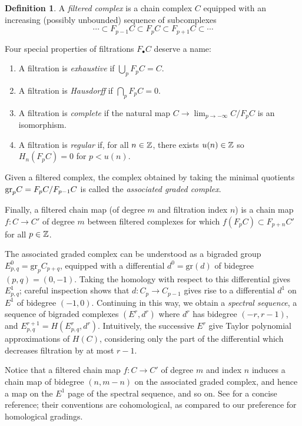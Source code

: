 \documentclass{memo-l}
\theoremstyle{definition}
\newtheorem{definition}[theorem]{Definition}
\theoremstyle{remark}
\numberwithin{section}{chapter}
\numberwithin{equation}{chapter}
\begin{document}
\begin{definition}\label{filtrations}
A \emph{filtered complex} is a chain complex $C$ equipped with an increasing (possibly unbounded) sequence of subcomplexes $$\cdots \subset F_{p-1} C \subset F_p C \subset F_{p+1} C \subset \cdots$$ 

Four special properties of filtrations $F_\bullet C$ deserve a name: \begin{enumerate}
\item A filtration is \emph{exhaustive} if $\bigcup_p F_p C = C$. 
\item A filtration is \emph{Hausdorff} if $\bigcap_p F_p C = 0$.
\item A filtration is \emph{complete} if the natural map $C \to \lim_{p \to -\infty} C/F_p C$ is an isomorphism.
\item A filtration is \emph{regular} if, for all $n \in \Bbb Z$, there exists $u(n) \in \Bbb Z$ so $H_n(F_p C) = 0$ for $p < u(n)$. 
\end{enumerate}

Given a filtered complex, the complex obtained by taking the minimal quotients $\textup{gr}_p C = F_p C/F_{p-1} C$ is called the \emph{associated graded complex}.

Finally, a \textup{filtered chain map} (of degree $m$ and filtration index $n$) is a chain map $f: C \to C'$ of degree $m$ between filtered complexes for which $f(F_p C) \subset F_{p+n} C'$ for all $p \in \Bbb Z$. 
\end{definition}

The associated graded complex can be understood as a bigraded group $E^0_{p,q} = \text{gr}_p C_{p+q}$, equipped with a differential $d^0 = \text{gr}(d)$ of bidegree $(p,q) = (0, -1)$. Taking the homology with respect to this differential gives $E^1_{p,q}$; careful inspection shows that $d: C_p \to C_{p-1}$ gives rise to a differential $d^1$ on $E^1$ of bidegree $(-1, 0)$. Continuing in this way, we obtain a \emph{spectral sequence}, a sequence of bigraded complexes $(E^r, d^r)$ where $d^r$ has bidegree $(-r, r-1)$, and $E^{r+1}_{p,q} = H(E^r_{p,q}, d^r)$. Intuitively, the successive $E^r$ give Taylor polynomial approximations of $H(C)$, considering only the part of the differential which decreases filtration by at most $r-1$.

Notice that a filtered chain map $f: C \to C'$ of degree $m$ and index $n$ induces a chain map of bidegree $(n,m-n)$ on the associated graded complex, and hence a map on the $E^1$ page of the spectral sequence, and so on. See \cite[Chapter XV]{CE} for a concise reference; their conventions are cohomological, as compared to our preference for homological gradings. 
\end{document}
